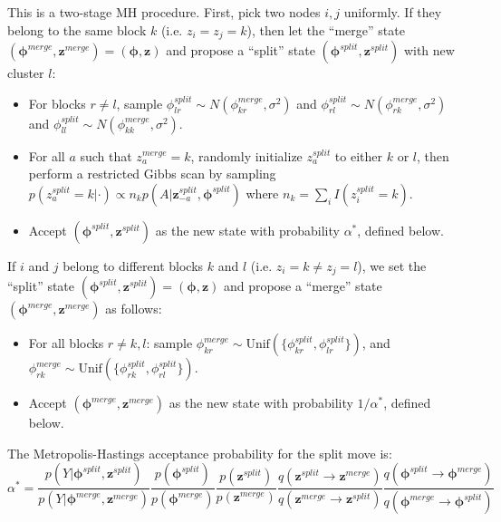 \documentclass{article}
\begin{document}
This is a two-stage MH procedure.  First, pick two nodes $i,j$ uniformly.  If they belong to the same block $k$ (i.e. $z_i=z_j=k$), then let the ``merge'' state $(\boldsymbol{\phi}^{merge},\mathbf{z}^{merge}) = (\boldsymbol{\phi},\mathbf{z})$ and propose a ``split'' state $(\boldsymbol{\phi}^{split},\mathbf{z}^{split})$ with new cluster $l$:
\begin{itemize}
\item For blocks $r \ne l$, sample $\phi_{lr}^{split} \sim N(\phi_{kr}^{merge},\sigma^2)$ and $\phi_{rl}^{split} \sim N(\phi_{rk}^{merge},\sigma^2)$ and $\phi_{ll}^{split} \sim N(\phi_{kk}^{merge}, \sigma^2)$.
\item For all $a$ such that $z_a^{merge} = k$, randomly initialize $z_a^{split}$ to either $k$ or $l$, then perform a restricted Gibbs scan by sampling $p(z_{a}^{split}=k|\cdot)  \propto n_k p(A|\mathbf{z}^{split}_{-a},\boldsymbol{\phi}^{split})$
where $n_k=\sum_{i}I(z_i^{split}=k)$.%
\item Accept  $(\boldsymbol{\phi}^{split},\mathbf{z}^{split})$ as the new state with probability $\alpha^*$, defined below.
\end{itemize}

 If $i$ and $j$ belong to different blocks $k$ and $l$ (i.e. $z_i = k \ne z_j=l$), we set the ``split'' state  $(\boldsymbol{\phi}^{split},\mathbf{z}^{split}) = (\boldsymbol{\phi},\mathbf{z})$ and propose a ``merge'' state $(\boldsymbol{\phi}^{merge},\mathbf{z}^{merge})$ as follows:
\begin{itemize}
\item For all blocks $r \ne k,l$: sample $\phi_{kr}^{merge} \sim \mbox{Unif}(\{\phi_{kr}^{split}, \phi_{lr}^{split}\})$, and $\phi_{rk}^{merge} \sim \mbox{Unif}(\{\phi_{rk}^{split}, \phi_{rl}^{split}\})$.%
\item Accept $(\boldsymbol{\phi}^{merge},\mathbf{z}^{merge})$ as the new state with probability $1/\alpha^*$, defined below.
\end{itemize}

 The Metropolis-Hastings acceptance probability for the split move is: $$\alpha^* =\frac{p(Y|\boldsymbol{\phi}^{split},\mathbf{z}^{split})}{p(Y|\boldsymbol{\phi}^{merge},\mathbf{z}^{merge})}  \frac{p(\boldsymbol{\phi}^{split})}{p(\boldsymbol{\phi}^{merge})} \frac{p(\mathbf{z}^{split})}{p(\mathbf{z}^{merge})} \frac{q(\mathbf{z}^{split} \rightarrow \mathbf{z}^{merge})}{q( \mathbf{z}^{merge} \rightarrow \mathbf{z}^{split})} \frac{q(\boldsymbol{\phi}^{split} \rightarrow \boldsymbol{\phi}^{merge})}{q(\boldsymbol{\phi}^{merge} \rightarrow \boldsymbol{\phi}^{split})}$$
\end{document}
